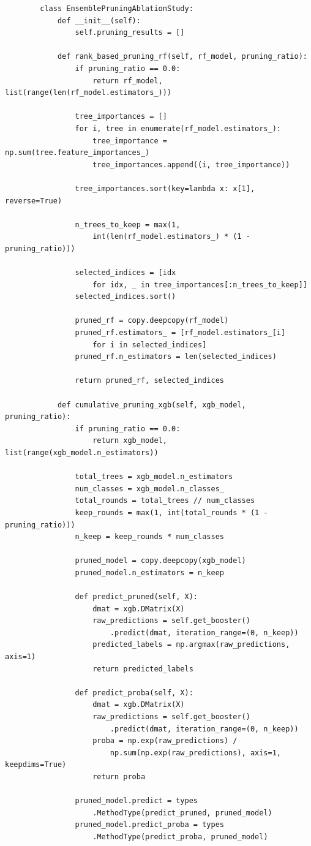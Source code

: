 \documentclass[a4paper,12pt]{report}
\begin{document}
	\begin{verbatim}
		class EnsemblePruningAblationStudy:
			def __init__(self):
				self.pruning_results = []
		
			def rank_based_pruning_rf(self, rf_model, pruning_ratio):
				if pruning_ratio == 0.0:
					return rf_model, list(range(len(rf_model.estimators_)))
		
				tree_importances = []
				for i, tree in enumerate(rf_model.estimators_):
					tree_importance = np.sum(tree.feature_importances_)
					tree_importances.append((i, tree_importance))
				
				tree_importances.sort(key=lambda x: x[1], reverse=True)
				
				n_trees_to_keep = max(1,
					int(len(rf_model.estimators_) * (1 - pruning_ratio)))
				
				selected_indices = [idx 
					for idx, _ in tree_importances[:n_trees_to_keep]]
				selected_indices.sort()
				
				pruned_rf = copy.deepcopy(rf_model)
				pruned_rf.estimators_ = [rf_model.estimators_[i] 
					for i in selected_indices]
				pruned_rf.n_estimators = len(selected_indices)
				
				return pruned_rf, selected_indices
		
			def cumulative_pruning_xgb(self, xgb_model, pruning_ratio):
				if pruning_ratio == 0.0:
					return xgb_model, list(range(xgb_model.n_estimators))
				
				total_trees = xgb_model.n_estimators
				num_classes = xgb_model.n_classes_
				total_rounds = total_trees // num_classes
				keep_rounds = max(1, int(total_rounds * (1 - pruning_ratio)))
				n_keep = keep_rounds * num_classes
				
				pruned_model = copy.deepcopy(xgb_model)
				pruned_model.n_estimators = n_keep
				
				def predict_pruned(self, X):
					dmat = xgb.DMatrix(X)
					raw_predictions = self.get_booster()
						.predict(dmat, iteration_range=(0, n_keep))
					predicted_labels = np.argmax(raw_predictions, axis=1)
					return predicted_labels
				
				def predict_proba(self, X):
					dmat = xgb.DMatrix(X)
					raw_predictions = self.get_booster()
						.predict(dmat, iteration_range=(0, n_keep))
					proba = np.exp(raw_predictions) / 
						np.sum(np.exp(raw_predictions), axis=1, keepdims=True)
					return proba
				
				pruned_model.predict = types
					.MethodType(predict_pruned, pruned_model)
				pruned_model.predict_proba = types
					.MethodType(predict_proba, pruned_model)
				

\end{verbatim}
\end{document}
